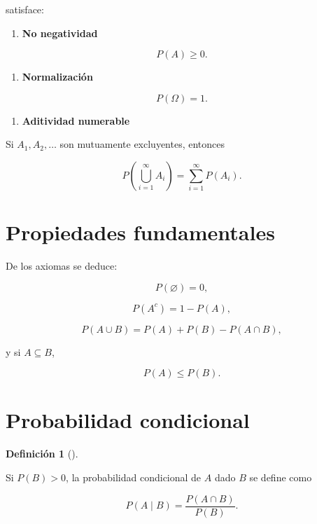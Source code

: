 \documentclass[
  spanish,
  11pt,
  letterpaper,
  DIV=11,
  numbers=noendperiod]{scrreprt}
\providecommand{\tightlist}{%
  \setlength{\itemsep}{0pt}\setlength{\parskip}{0pt}}
\theoremstyle{definition}
\newtheorem{definition}{Definición}[chapter]
\theoremstyle{plain}
\theoremstyle{definition}
\theoremstyle{remark}
\begin{document}
satisface:

\begin{enumerate}
\def\labelenumi{\arabic{enumi}.}
\tightlist
\item
  \textbf{No negatividad}
\end{enumerate}

\[
P(A)\geq 0.
\]

\begin{enumerate}
\def\labelenumi{\arabic{enumi}.}
\setcounter{enumi}{1}
\tightlist
\item
  \textbf{Normalización}
\end{enumerate}

\[
P(\Omega)=1.
\]

\begin{enumerate}
\def\labelenumi{\arabic{enumi}.}
\setcounter{enumi}{2}
\tightlist
\item
  \textbf{Aditividad numerable}
\end{enumerate}

Si \(A_1,A_2,\ldots\) son mutuamente excluyentes, entonces

\[
P\left(
\bigcup_{i=1}^{\infty}A_i
\right)
=
\sum_{i=1}^{\infty}P(A_i).
\]

\section{Propiedades fundamentales}\label{propiedades-fundamentales-1}

De los axiomas se deduce:

\[
P(\varnothing)=0,
\]

\[
P(A^c)=1-P(A),
\]

\[
P(A\cup B)
=
P(A)+P(B)-P(A\cap B),
\]

y si \(A\subseteq B\),

\[
P(A)\leq P(B).
\]

\section{Probabilidad condicional}\label{probabilidad-condicional}

\begin{definition}[]\protect\hypertarget{def-probabilidad-condicional}{}\label{def-probabilidad-condicional}

Si \(P(B)>0\), la probabilidad condicional de \(A\) dado \(B\) se define
como

\[
P(A\mid B)
=
\frac{P(A\cap B)}{P(B)}.
\]

\end{definition}
\end{document}
